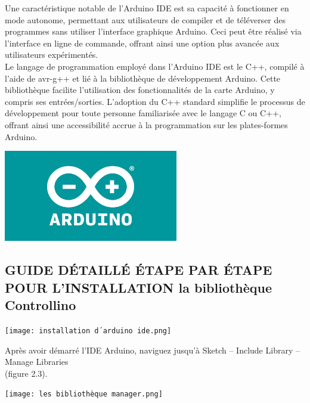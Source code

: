 \documentclass[a4paper,12pt]{report}
\begin{document}
Une caractéristique notable de l'Arduino IDE est sa capacité à fonctionner en mode autonome, permettant aux utilisateurs de compiler et de téléverser des programmes sans utiliser l'interface graphique Arduino. Ceci peut être réalisé via l'interface en ligne de commande, offrant ainsi une option plus avancée aux utilisateurs expérimentés.\\

Le langage de programmation employé dans l'Arduino IDE est le C++, compilé à l'aide de avr-g++ et lié à la bibliothèque de développement Arduino. Cette bibliothèque facilite l'utilisation des fonctionnalités de la carte Arduino, y compris ses entrées/sorties. L'adoption du C++ standard simplifie le processus de développement pour toute personne familiarisée avec le langage C ou C++, offrant ainsi une accessibilité accrue à la programmation sur les plates-formes Arduino.\\


\begin{center}
\includegraphics[height=4cm]{arduino_logo.png}
\label{}
\end{center}

\subsection{GUIDE DÉTAILLÉ ÉTAPE PAR ÉTAPE POUR L’INSTALLATION la bibliothèque Controllino}

\begin{center}
\texttt{[image: installation d´arduino ide.png]}
\label{}
\end{center}

Après avoir démarré l’IDE Arduino, naviguez jusqu’à Sketch – Include Library – Manage Libraries\\
(figure 2.3).\\

\begin{center}
\texttt{[image: les bibliothèque manager.png]}
\label{}
\end{center}
\end{document}
